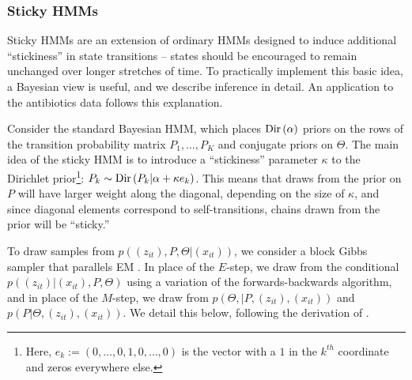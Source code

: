 \subsubsection{Sticky HMMs}
\label{sec:sticky_hmms}

Sticky HMMs are an extension of ordinary HMMs designed to induce additional
``stickiness'' in state transitions -- states should be encouraged to remain
unchanged over longer stretches of time. To practically implement this basic
idea, a Bayesian view is useful, and we describe inference in detail. An
application to the antibiotics data follows this explanation.

Consider the standard Bayesian HMM, which places $\textnormal{Dir}\left(\alpha\right)$
priors on the rows of the transition probability matrix $P_{1}, \dots, P_{K}$
and conjugate priors on $\Theta$. The main idea of the sticky HMM is to
introduce a ``stickiness'' parameter $\kappa$ to the Dirichlet
prior\footnote{Here, $e_{k} := \left(0, \dots, 0, 1, 0, \dots, 0\right)$ is the
  vector with a $1$ in the $k^{th}$ coordinate and zeros everywhere else.}:
$P_{k} \sim \textnormal{Dir}\left(P_{k} \vert \alpha + \kappa e_{k}\right)$. This means that
draws from the prior on $P$ will have larger weight along the diagonal,
depending on the size of $\kappa$, and since diagonal elements correspond to
self-transitions, chains drawn from the prior will be ``sticky.''

To draw samples from $p\left(\left(z_{it}\right), P, \Theta \vert
\left(x_{it}\right)\right)$, we consider a block Gibbs sampler that parallels EM
\citep{fruhwirth2006finite}. In place of the $E$-step, we draw from the
conditional $p\left(\left(z_{it}\right) \vert \left(x_{it}\right), P,
\Theta\right)$ using a variation of the forwards-backwards algorithm, and in
place of the $M$-step, we draw from $p\left(\Theta, \vert P,
\left(z_{it}\right), \left(x_{it}\right)\right)$ and $p\left(P \vert \Theta,
\left(z_{it}\right), \left(x_{it}\right)\right)$. We detail this below,
following the derivation of \citep{fox2009bayesian}.

